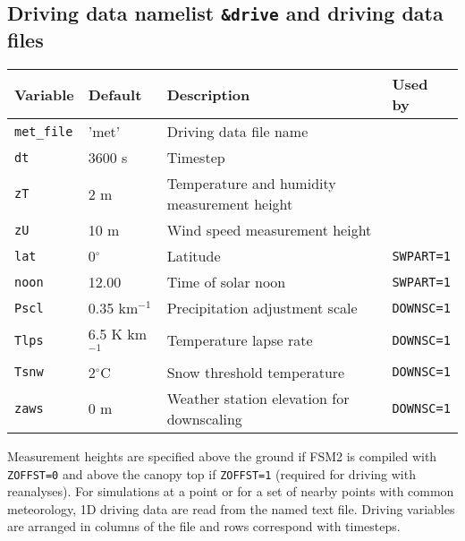 \documentclass{article}
\begin{document}
\subsection{Driving data namelist {\tt \&drive} and driving data files}

\begin{longtable}{|l|l|l|l|}
\hline
Variable        & Default & Description                               & Used by       \\
\hline
{\tt met\_file} & 'met'   & Driving data file name                    &               \\
{\tt dt}        & 3600 s  & Timestep                                  &               \\
{\tt zT}        & 2 m     & Temperature and humidity measurement height &             \\
{\tt zU}        & 10 m    & Wind speed measurement height             &               \\
{\tt lat}       &0$^\circ$& Latitude                                  &{\tt SWPART=1} \\
{\tt noon}      & 12.00   & Time of solar noon                        &{\tt SWPART=1} \\
{\tt Pscl}      & 0.35 km$^{-1}$  & Precipitation adjustment scale    &{\tt DOWNSC=1} \\
{\tt Tlps}      & 6.5 K km$^{-1}$ & Temperature lapse rate            &{\tt DOWNSC=1} \\
{\tt Tsnw}      & 2$^\circ$C      & Snow threshold temperature        &{\tt DOWNSC=1} \\
{\tt zaws}      & 0 m     & Weather station elevation for downscaling &{\tt DOWNSC=1} \\
\hline 
\end{longtable}

Measurement heights are specified above the ground if FSM2 is compiled with {\tt ZOFFST=0} and above the canopy top if {\tt ZOFFST=1} (required for driving with reanalyses). For simulations at a point or for a set of nearby points with common meteorology, 1D driving data are read from the named text file. Driving variables are arranged in columns of the file and rows correspond with timesteps.
\end{document}
